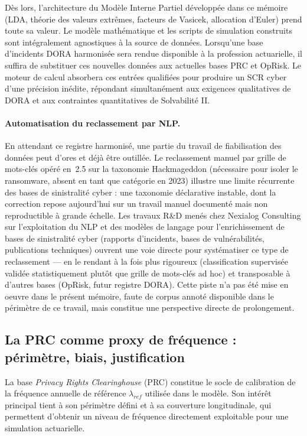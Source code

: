 \documentclass[11pt,a4paper]{article}
\theoremstyle{navystyle}
\theoremstyle{navydef}
\begin{document}
Dès lors, l'architecture du Modèle Interne Partiel développée dans ce mémoire (LDA, théorie des valeurs extrêmes, facteurs de Vasicek, allocation d'Euler) prend toute sa valeur. Le modèle mathématique et les scripts de simulation construits sont intégralement agnostiques à la source de données. Lorsqu'une base d'incidents DORA harmonisée sera rendue disponible à la profession actuarielle, il suffira de substituer ces nouvelles données aux actuelles bases PRC et OpRisk. Le moteur de calcul absorbera ces entrées qualifiées pour produire un SCR cyber d'une précision inédite, répondant simultanément aux exigences qualitatives de DORA et aux contraintes quantitatives de Solvabilité II.

\paragraph{Automatisation du reclassement par NLP.} En attendant ce registre harmonisé, une partie du travail de fiabilisation des données peut d'ores et déjà être outillée. Le reclassement manuel par grille de mots-clés opéré en~2.5 sur la taxonomie Hackmageddon (nécessaire pour isoler le ransomware, absent en tant que catégorie en 2023) illustre une limite récurrente des bases de sinistralité cyber : une taxonomie déclarative instable, dont la correction repose aujourd'hui sur un travail manuel documenté mais non reproductible à grande échelle. Les travaux R\&D menés chez Nexialog Consulting sur l'exploitation du NLP et des modèles de langage pour l'enrichissement de bases de sinistralité cyber (rapports d'incidents, bases de vulnérabilités, publications techniques) ouvrent une voie directe pour systématiser ce type de reclassement --- en le rendant à la fois plus rigoureux (classification supervisée validée statistiquement plutôt que grille de mots-clés ad hoc) et transposable à d'autres bases (OpRisk, futur registre DORA). Cette piste n'a pas été mise en oeuvre dans le présent mémoire, faute de corpus annoté disponible dans le périmètre de ce travail, mais constitue une perspective directe de prolongement.

\subsection{La PRC comme proxy de fréquence : périmètre, biais, justification}

La base \emph{Privacy Rights Clearinghouse} (PRC) constitue le socle de
calibration de la fréquence annuelle de référence $\lambda_{ref}$ utilisée
dans le modèle. Son intérêt principal tient à son périmètre défini et à sa
couverture longitudinale, qui permettent d'obtenir un niveau de fréquence
directement exploitable pour une simulation actuarielle.
\end{document}
